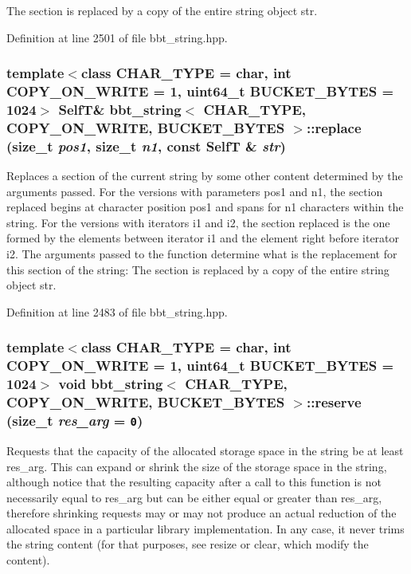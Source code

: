 The section is replaced by a copy of the entire string object str. 

Definition at line 2501 of file bbt\_\-string.hpp.\hypertarget{classbbt__string_e00ce88ee9fb5e57bdd03b293752cd1a}{
\subsubsection[{replace}]{\setlength{\rightskip}{0pt plus 5cm}template$<$class CHAR\_\-TYPE  = char, int COPY\_\-ON\_\-WRITE = 1, uint64\_\-t BUCKET\_\-BYTES = 1024$>$ {\bf SelfT}\& {\bf bbt\_\-string}$<$ CHAR\_\-TYPE, COPY\_\-ON\_\-WRITE, BUCKET\_\-BYTES $>$::replace (size\_\-t {\em pos1}, \/  size\_\-t {\em n1}, \/  const {\bf SelfT} \& {\em str})}}
\label{classbbt__string_e00ce88ee9fb5e57bdd03b293752cd1a}


Replaces a section of the current string by some other content determined by the arguments passed. For the versions with parameters pos1 and n1, the section replaced begins at character position pos1 and spans for n1 characters within the string. For the versions with iterators i1 and i2, the section replaced is the one formed by the elements between iterator i1 and the element right before iterator i2. The arguments passed to the function determine what is the replacement for this section of the string: The section is replaced by a copy of the entire string object str. 

Definition at line 2483 of file bbt\_\-string.hpp.\hypertarget{classbbt__string_2c7fe2805ecfdf1d9ddcd66c4e5c80f1}{
\subsubsection[{reserve}]{\setlength{\rightskip}{0pt plus 5cm}template$<$class CHAR\_\-TYPE  = char, int COPY\_\-ON\_\-WRITE = 1, uint64\_\-t BUCKET\_\-BYTES = 1024$>$ void {\bf bbt\_\-string}$<$ CHAR\_\-TYPE, COPY\_\-ON\_\-WRITE, BUCKET\_\-BYTES $>$::reserve (size\_\-t {\em res\_\-arg} = {\tt 0})}}
\label{classbbt__string_2c7fe2805ecfdf1d9ddcd66c4e5c80f1}


Requests that the capacity of the allocated storage space in the string be at least res\_\-arg. This can expand or shrink the size of the storage space in the string, although notice that the resulting capacity after a call to this function is not necessarily equal to res\_\-arg but can be either equal or greater than res\_\-arg, therefore shrinking requests may or may not produce an actual reduction of the allocated space in a particular library implementation. In any case, it never trims the string content (for that purposes, see resize or clear, which modify the content). 

